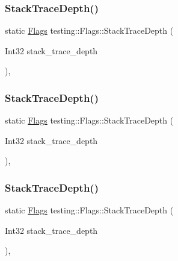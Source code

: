 \mbox{\label{structtesting_1_1_flags_a16b01d8bcceaa9fa8211fd24faa75b5a}} 
\subsubsection{\texorpdfstring{StackTraceDepth()}{StackTraceDepth()}\hspace{0.1cm}{\footnotesize\ttfamily [1/3]}}
{\footnotesize\ttfamily static \mbox{\hyperlink{structtesting_1_1_flags}{Flags}} testing\+::\+Flags\+::\+Stack\+Trace\+Depth (\begin{DoxyParamCaption}\item[{Int32}]{stack\+\_\+trace\+\_\+depth }\end{DoxyParamCaption})\hspace{0.3cm}{\ttfamily [inline]}, {\ttfamily [static]}}

\mbox{\label{structtesting_1_1_flags_a16b01d8bcceaa9fa8211fd24faa75b5a}} 
\subsubsection{\texorpdfstring{StackTraceDepth()}{StackTraceDepth()}\hspace{0.1cm}{\footnotesize\ttfamily [2/3]}}
{\footnotesize\ttfamily static \mbox{\hyperlink{structtesting_1_1_flags}{Flags}} testing\+::\+Flags\+::\+Stack\+Trace\+Depth (\begin{DoxyParamCaption}\item[{Int32}]{stack\+\_\+trace\+\_\+depth }\end{DoxyParamCaption})\hspace{0.3cm}{\ttfamily [inline]}, {\ttfamily [static]}}

\mbox{\label{structtesting_1_1_flags_a16b01d8bcceaa9fa8211fd24faa75b5a}} 
\subsubsection{\texorpdfstring{StackTraceDepth()}{StackTraceDepth()}\hspace{0.1cm}{\footnotesize\ttfamily [3/3]}}
{\footnotesize\ttfamily static \mbox{\hyperlink{structtesting_1_1_flags}{Flags}} testing\+::\+Flags\+::\+Stack\+Trace\+Depth (\begin{DoxyParamCaption}\item[{Int32}]{stack\+\_\+trace\+\_\+depth }\end{DoxyParamCaption})\hspace{0.3cm}{\ttfamily [inline]}, {\ttfamily [static]}}


